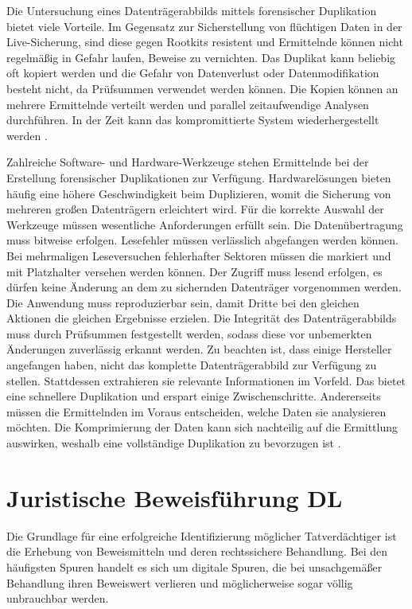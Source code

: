 \documentclass[12pt,DIV=14, version=first, BCOR=10mm,a4paper,twoside,parskip=half-,headsepline,headinclude]{scrartcl}
\begin{document}
	    Die Untersuchung eines Datenträgerabbilds mittels forensischer Duplikation bietet viele Vorteile. Im Gegensatz zur Sicherstellung von flüchtigen Daten in der Live-Sicherung, sind diese gegen Rootkits resistent \cite[vgl. S. 70]{BSI_leitfaden} und Ermittelnde können nicht regelmäßig in Gefahr laufen, Beweise zu vernichten. Das Duplikat kann beliebig oft kopiert werden und die Gefahr von Datenverlust oder Datenmodifikation besteht nicht, da Prüfsummen verwendet werden können. Die Kopien können an mehrere Ermittelnde verteilt werden und parallel zeitaufwendige Analysen durchführen. In der Zeit kann das kompromittierte System wiederhergestellt werden \cite[vgl. S. 92]{texbook01}.
	    
	    Zahlreiche Software- und Hardware-Werkzeuge stehen Ermittelnde bei der Erstellung forensischer Duplikationen zur Verfügung. Hardwarelösungen bieten häufig eine höhere Geschwindigkeit beim Duplizieren, womit die Sicherung von mehreren großen Datenträgern erleichtert wird. Für die korrekte Auswahl der Werkzeuge müssen wesentliche Anforderungen erfüllt sein. Die Datenübertragung muss bitweise erfolgen. Lesefehler müssen verlässlich abgefangen werden können. Bei mehrmaligen Leseversuchen fehlerhafter Sektoren müssen die markiert und mit Platzhalter versehen werden können. Der Zugriff muss lesend erfolgen, es dürfen keine Änderung an dem zu sichernden Datenträger vorgenommen werden. Die Anwendung muss reproduzierbar sein, damit Dritte bei den gleichen Aktionen die gleichen Ergebnisse erzielen. Die Integrität des Datenträgerabbilds muss durch Prüfsummen festgestellt werden, sodass diese vor unbemerkten Änderungen zuverlässig erkannt werden. Zu beachten ist, dass einige Hersteller angefangen haben, nicht das komplette Datenträgerabbild zur Verfügung zu stellen. Stattdessen extrahieren sie relevante Informationen im Vorfeld. Das bietet eine schnellere Duplikation und erspart einige Zwischenschritte. Andererseits müssen die Ermittelnden im Voraus entscheiden, welche Daten sie analysieren möchten. Die Komprimierung der Daten kann sich nachteilig auf die Ermittlung auswirken, weshalb eine vollständige Duplikation zu bevorzugen ist \cite[vgl. S. 93-94]{texbook01}.

\section {Juristische Beweisführung DL}
Die Grundlage für eine erfolgreiche Identifizierung möglicher Tatverdächtiger ist die Erhebung von Beweismitteln und deren rechtssichere Behandlung. Bei den häufigsten Spuren handelt es sich um digitale Spuren, die bei unsachgemäßer Behandlung ihren Beweiswert verlieren und möglicherweise sogar völlig unbrauchbar werden. 
\end{document}
